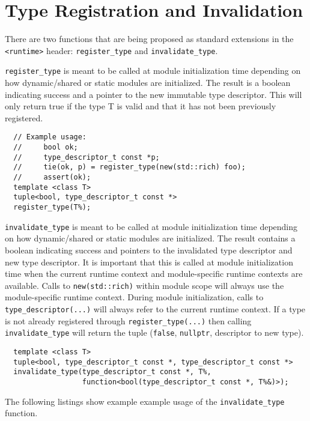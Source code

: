 \section{Type Registration and Invalidation}
\label{appendix:type-registration-invalidation}

There are two functions that are being proposed as standard extensions in the
\verb+<runtime>+ header: \verb+register_type+ and \verb+invalidate_type+.

\verb+register_type+ is meant to be called at module initialization time
depending on how dynamic/shared or static modules are initialized.  The result
is a boolean indicating success and a pointer to the new immutable type
descriptor. This will only return true if the type T is valid and that it has
not been previously registered.

\begin{verbatim}
  // Example usage:
  //     bool ok;
  //     type_descriptor_t const *p;
  //     tie(ok, p) = register_type(new(std::rich) foo);
  //     assert(ok);
  template <class T>
  tuple<bool, type_descriptor_t const *>
  register_type(T%);
\end{verbatim}

\verb+invalidate_type+ is meant to be called at module initialization time
depending on how dynamic/shared or static modules are initialized.
The result contains a boolean indicating success and pointers to the
invalidated type descriptor and new type descriptor. It is important
that this is called at module initialization time when the current
runtime context and module-specific runtime contexts are available.
Calls to \verb+new(std::rich)+ within module scope will always use the
module-specific runtime context. During module initialization, calls
to \verb+type_descriptor(...)+ will always refer to the current runtime
context. If a type is not already registered through
\verb+register_type(...)+ then calling \verb+invalidate_type+ will return the tuple
(\verb+false+, \verb+nullptr+, descriptor to new type).

\begin{verbatim}
  template <class T>
  tuple<bool, type_descriptor_t const *, type_descriptor_t const *>
  invalidate_type(type_descriptor_t const *, T%,
                  function<bool(type_descriptor_t const *, T%&)>);
\end{verbatim}

The following listings show example example usage of the \verb+invalidate_type+
function.

